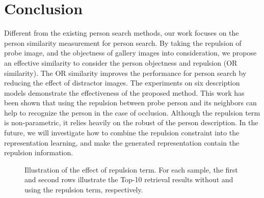\documentclass[journal]{IEEEtran}
\begin{document}
\section{Conclusion}
Different from the existing person search methods, our work focuses on the person similarity measurement for person search. By taking the repulsion of probe image, and the objectness of gallery images into consideration, we propose an effective similarity to consider the person objectness and repulsion (OR similarity). 
The OR similarity improves the performance for person search by reducing the effect of distractor images. The experiments on six description models demonstrate the effectiveness of the proposed method. This work has been shown that using the repulsion between probe person and its neighbors can help to recognize the person in the case of occlusion. Although the repulsion term is non-parametric, it relies heavily on the robust of the person description. In the future, we will investigate how to combine the repulsion constraint into the representation learning, and make the generated representation contain the repulsion information.

\begin{figure*}
\begin{center}
\end{center}
\caption{Illustration of the effect of repulsion term. For each sample, the first and second rows illustrate the Top-10 retrieval results without and using the repulsion term, respectively. }
\label{Fig:vis_re}
\end{figure*}


%
%
%




\ifCLASSOPTIONcaptionsoff
  \newpage
\fi




%

%
%
%
\end{document}
